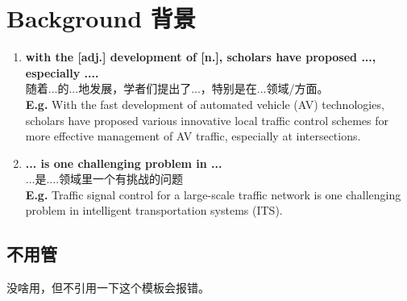 \chapter{Background 背景}

\begin{enumerate}

    \item \textbf{with the [adj.] development of [n.], scholars have proposed ..., especially ....} \\ 随着...的...地发展，学者们提出了...，特别是在...领域/方面。
    \\
    \textbf{E.g.} With the fast development of automated vehicle (AV) technologies, scholars have proposed various innovative local traffic control schemes for more effective management of AV traffic, especially at intersections.
    
    \item \textbf{... is one challenging problem in ...} \\
    ...是....领域里一个有挑战的问题
    \\ \textbf{E.g.} Traffic signal control for a large-scale traffic network is one challenging problem in intelligent transportation systems (ITS). 
    
    
    
    
\end{enumerate}


\section*{不用管}
没啥用，但不引用一下这个模板会报错\cite{gbt7714}。